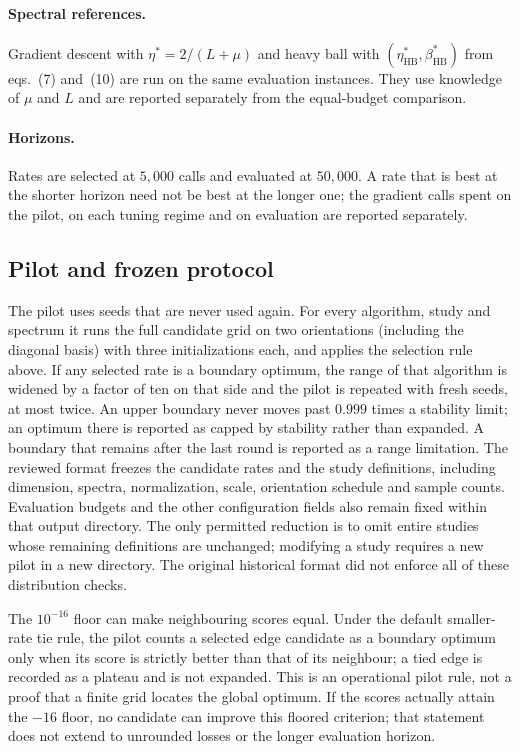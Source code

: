\documentclass[11pt,a4paper]{article}
\begin{document}
\paragraph{Spectral references.} Gradient descent with $\eta^\ast=2/(L+\mu)$
and heavy ball with $(\eta^\ast_{\mathrm{HB}},\beta^\ast_{\mathrm{HB}})$ from
eqs.~(7) and~(10) are run on the same evaluation instances. They use knowledge
of $\mu$ and $L$ and are reported separately from the equal-budget comparison.

\paragraph{Horizons.} Rates are selected at $5{,}000$ calls and evaluated at
$50{,}000$. A rate that is best at the shorter horizon need not be best at the
longer one; the gradient calls spent on the pilot, on each tuning regime and on
evaluation are reported separately.

\subsection{Pilot and frozen protocol}
The pilot uses seeds that are never used again. For every algorithm, study and
spectrum it runs the full candidate grid on two orientations (including the
diagonal basis) with three initializations each, and applies the selection
rule above. If any selected rate is a boundary optimum, the range of that
algorithm is widened by a factor of ten on that side and the pilot is repeated
with fresh seeds, at most twice. An upper boundary never moves past
$0.999$ times a stability limit; an optimum there is reported as capped by
stability rather than expanded. A boundary that remains after the last round
is reported as a range limitation. The reviewed format freezes the candidate
rates and the study definitions, including dimension, spectra, normalization,
scale, orientation schedule and sample counts. Evaluation budgets and the other
configuration fields also remain fixed within that output directory. The only
permitted reduction is to omit entire studies whose remaining definitions are
unchanged; modifying a study requires a new pilot in a new directory. The
original historical format did not enforce all of these distribution checks.

The $10^{-16}$ floor can make neighbouring scores equal. Under the default
smaller-rate tie rule, the pilot counts a selected edge candidate as a boundary
optimum only when its score is strictly better than that of its neighbour; a tied edge is recorded as a plateau
and is not expanded. This is an operational pilot rule, not a proof that a
finite grid locates the global optimum. If the scores actually attain the
$-16$ floor, no candidate can improve this floored criterion; that statement
does not extend to unrounded losses or the longer evaluation horizon.
\end{document}
